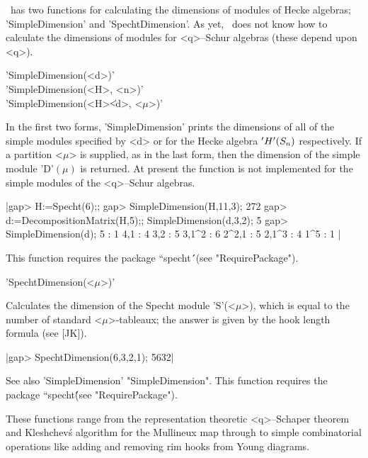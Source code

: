 \Specht\ has two functions for calculating the dimensions of modules
of Hecke algebras; 'SimpleDimension' and 'SpechtDimension'. As yet,
\Specht\ does not know how to calculate the dimensions of modules for
<q>--Schur algebras (these depend upon <q>).



'SimpleDimension(<d>)'\\
'SimpleDimension(<H>, <n>)'\\
'SimpleDimension(<H>\|<d>, <$\mu$>)'

In the first two forms, 'SimpleDimension' prints the dimensions of all
of the simple modules specified by <d> or for the Hecke algebra
$'H'(S_n)$ respectively. If a partition <$\mu$> is supplied, as in the 
last form, then the dimension of the simple module 'D'$(\mu)$ is 
returned.  At present the function is not implemented for the simple 
modules of the <q>--Schur algebras.

|gap> H:=Specht(6);;
gap> SimpleDimension(H,11,3);
272
gap> d:=DecompositionMatrix(H,5);; SimpleDimension(d,3,2);
5
gap> SimpleDimension(d);
5     : 1
4,1   : 4
3,2   : 5
3,1^2 : 6
2^2,1 : 5
2,1^3 : 4
1^5   : 1
|


This function requires the package ``specht\'\'\ (see "RequirePackage").



'SpechtDimension(<$\mu$>)'

Calculates the dimension of the Specht module 'S'(<$\mu$>), which is equal 
to the number of standard <$\mu$>-tableaux; the answer is given by the hook
length formula (see [JK]).

|gap> SpechtDimension(6,3,2,1);
5632|

See also 'SimpleDimension' "SimpleDimension". This function requires
the package ``specht\'\' (see "RequirePackage").



These functions range from the representation theoretic <q>--Schaper
theorem and Kleshchev\'s algorithm for the Mullineux map through to
simple combinatorial operations like adding and removing rim hooks from
Young diagrams.

